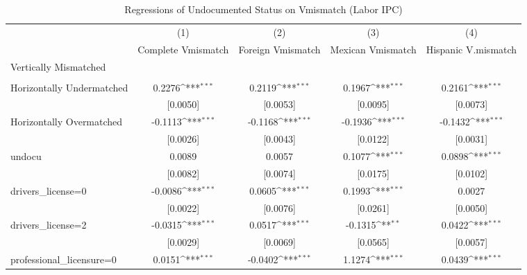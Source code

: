 \begin{table}[htbp]\centering
\def\sym#1{\ifmmode^{#1}\else\(^{#1}\)\fi}
\caption{Regressions of Undocumented Status on Vmismatch (Labor IPC)}
\begin{tabular}{l*{4}{c}}
\toprule
                    &\multicolumn{1}{c}{(1)}         &\multicolumn{1}{c}{(2)}         &\multicolumn{1}{c}{(3)}         &\multicolumn{1}{c}{(4)}         \\
                    &Complete Vmismatch         &Foreign Vmismatch         &Mexican Vmismatch         &Hispanic V.mismatch         \\
\midrule
Vertically Mismatched&                     &                     &                     &                     \\
                    &                     &                     &                     &                     \\
\addlinespace
Horizontally Undermatched&      0.2276\sym{***}&      0.2119\sym{***}&      0.1967\sym{***}&      0.2161\sym{***}\\
                    &    [0.0050]         &    [0.0053]         &    [0.0095]         &    [0.0073]         \\
\addlinespace
Horizontally Overmatched&     -0.1113\sym{***}&     -0.1168\sym{***}&     -0.1936\sym{***}&     -0.1432\sym{***}\\
                    &    [0.0026]         &    [0.0043]         &    [0.0122]         &    [0.0031]         \\
\addlinespace
undocu              &      0.0089         &      0.0057         &      0.1077\sym{***}&      0.0898\sym{***}\\
                    &    [0.0082]         &    [0.0074]         &    [0.0175]         &    [0.0102]         \\
\addlinespace
drivers\_license=0   &     -0.0086\sym{***}&      0.0605\sym{***}&      0.1993\sym{***}&      0.0027         \\
                    &    [0.0022]         &    [0.0076]         &    [0.0261]         &    [0.0050]         \\
\addlinespace
drivers\_license=2   &     -0.0315\sym{***}&      0.0517\sym{***}&     -0.1315\sym{**} &      0.0422\sym{***}\\
                    &    [0.0029]         &    [0.0069]         &    [0.0565]         &    [0.0057]         \\
\addlinespace
professional\_licensure=0&      0.0151\sym{***}&     -0.0402\sym{***}&      1.1274\sym{***}&      0.0439\sym{***}\\

\end{tabular}
\end{table}
